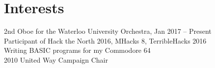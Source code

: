 \documentclass[]{deedy-resume-openfont}
\begin{document}
\begin{minipage}[t]{0.3\textwidth}
\section{Interests}
\textbullet{} 2nd Oboe for the Waterloo University Orchestra, Jan 2017 – Present\\
\textbullet{} Participant of Hack the North 2016, MHacks 8, TerribleHacks 2016\\
\textbullet{} Writing BASIC programs for my Commodore 64\\
\textbullet{} 2010 United Way Campaign Chair

%
%

\end{minipage} 
\hfill
\end{document}
